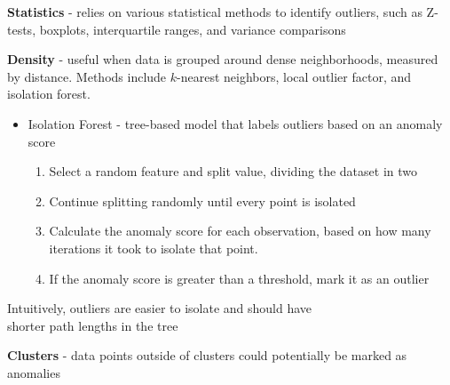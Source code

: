 \documentclass[10pt,landscape]{article}
\begin{document}
\begin{multicols}{3}
\textbf{Statistics} - relies on various statistical methods to identify outliers, such as Z-tests, boxplots, interquartile ranges, and variance comparisons

\textbf{Density} - useful when data is grouped around dense neighborhoods, measured by distance. Methods include $k$-nearest neighbors, local outlier factor, and isolation forest.
\begin{itemize}[label={--},leftmargin=4mm]
\itemsep -.4mm 
\item Isolation Forest - tree-based model that labels outliers based on an anomaly score\\
\vspace{-1.5mm}
\begin{enumerate}[leftmargin=4mm]
\itemsep -.4mm 
\item Select a random feature and split value, dividing the dataset in two
\item Continue splitting randomly until every point is isolated
\item Calculate the anomaly score for each observation, based on how many iterations it took to isolate that point.
\item If the anomaly score is greater than a threshold, mark it as an outlier
\end{enumerate}
\end{itemize}
\vspace{-2.5mm}
\hspace{4mm}Intuitively, outliers are easier to isolate and should have\\\hspace{4mm}shorter path lengths in the tree

\vspace{1mm}
\textbf{Clusters} - data points outside of clusters could potentially be marked as anomalies


\end{multicols}
\end{document}
